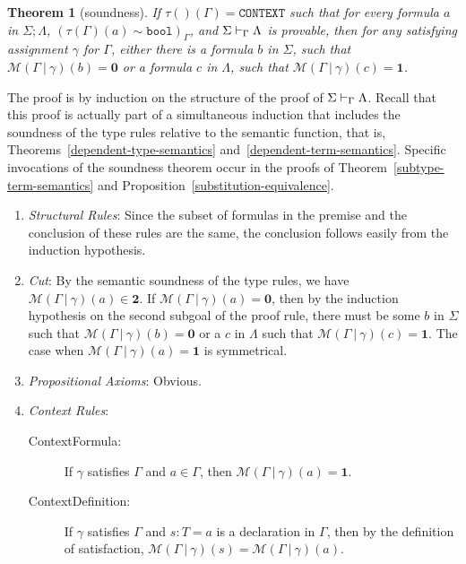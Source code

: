 \documentclass [12pt,twoside]{cslreport}
\newcommand{\thmbox}
   {{\ \hfill\hbox{%
      \vrule width1.0ex height1.0ex
   }\parfillskip 0pt }}
\newenvironment{proof}{{\bf Proof. }}{\thmbox}
\newcommand{\tauGamma}[1]{\tau(\Gamma)(#1)}
\newcommand{\Mgamma}[1]{{\mathcal M}(\Gamma\vbar\gamma)(#1)}
\newcommand{\twob}{\mathbf{2}}
\newcommand{\oneb}{\mathbf{1}}
\newcommand{\zerob}{\mathbf{0}}
\newcommand{\ttbool}{\mathtt{bool}}
\newcommand{\ttcontext}{\mathtt{CONTEXT}}
\newcommand{\vbar}{\ |\ }
\newtheorem{theorem}{Theorem}
\begin{document}
\begin{theorem}[soundness]\label{proof-soundness}
If $\tau()(\Gamma) = \ttcontext$ such that
for every formula $a$ in $\Sigma;  \Lambda$, $(\tauGamma{a} \sim
\ttbool)_\Gamma$,
and $\Sigma\vdash_{\Gamma}\Lambda$ is provable, then
for any satisfying assignment
$\gamma$ for $\Gamma$, 
either there is a formula $b$ in $\Sigma$, such that $\Mgamma{b} = \zerob$
or a formula $c$ in
$\Lambda$, such that $\Mgamma{c} = \oneb$\@.      
\end{theorem}
\begin{proof}
The proof is by induction on the structure of the proof of
$\Sigma\vdash_{\Gamma}\Lambda$.  Recall that this proof is actually
part of a simultaneous induction that includes the soundness of the type
rules relative to the semantic function, that is,
Theorems~\ref{dependent-type-semantics}
and~\ref{dependent-term-semantics}\@.   Specific invocations of the
soundness theorem occur in the proofs of
Theorem~\ref{subtype-term-semantics}
and Proposition~\ref{substitution-equivalence}\@.  
\begin{enumerate}
\item {\em Structural Rules\/}:   Since the subset
of formulas in the premise and the conclusion of these rules are the same,
the conclusion follows easily from the induction hypothesis.

\item {\em Cut\/}: By the semantic soundness of the type rules,
we have $\Mgamma{a} \in \twob$\@.   If $\Mgamma{a} = \zerob$, then
by the induction hypothesis on the second subgoal of the proof rule,
there must be some $b$ in $\Sigma$ such that $\Mgamma{b} = \zerob$
or a $c$ in $\Lambda$ such that $\Mgamma{c} = \oneb$\@.  The case
when $\Mgamma{a} = \oneb$ is symmetrical.

\item {\em Propositional Axioms\/}:  Obvious.

\item \emph{Context Rules}:
\begin{description}
\item[ContextFormula:]  If $\gamma$ satisfies $\Gamma$ and $a\in \Gamma$,
then $\Mgamma{a} = \oneb$\@.

\item[ContextDefinition:] If $\gamma$ satisfies $\Gamma$ and $s: T = a$
is a declaration in $\Gamma$, then by the definition of satisfaction,
$\Mgamma{s} = \Mgamma{a}$\@.


\end{description}
\end{enumerate}
\end{proof}
\end{document}
